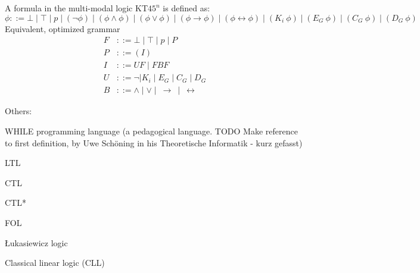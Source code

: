 \documentclass{article}
\begin{document}
A formula in the multi-modal logic KT\(45^n\) is defined as:
\[
  \phi ::= \bot \mid \top \mid p \mid (\neg \phi) \mid (\phi \land \phi) \mid (\phi \lor \phi) \mid (\phi \to \phi) \mid (\phi \leftrightarrow \phi) \mid (K_i~\phi) \mid (E_G~\phi) \mid (C_G~\phi) \mid (D_G~\phi)
\]
Equivalent, optimized grammar %
  \begin{align*}
    F & ::= \bot \mid \top \mid p \mid P \\
    P & ::= (I) \\
    I & ::= U F \mid F B F \\
    U & ::= \neg \mid K_i \mid E_G \mid C_G \mid D_G \\
    B & ::= \land \mid \lor \mid \:\to \: \mid \:\leftrightarrow
  \end{align*}

Others:

WHILE programming language (a pedagogical language. TODO Make reference to first definition, by Uwe
Schöning in his Theoretische Informatik - kurz gefasst)

LTL

CTL

CTL*

FOL

Łukasiewicz logic

Classical linear logic (CLL)


\newpage


\end{document}
